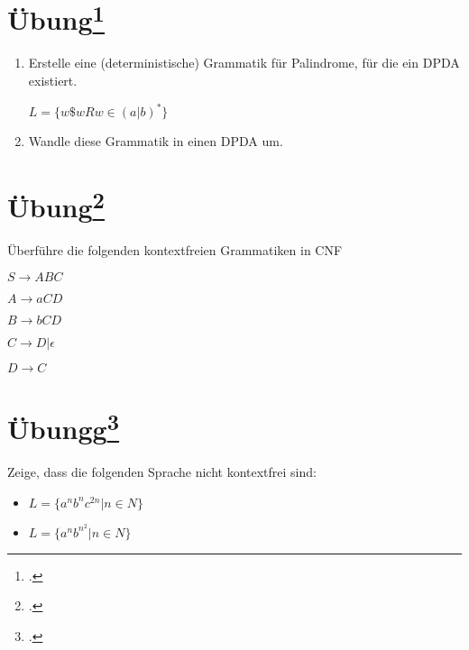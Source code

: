 \documentclass{lehramt-informatik-aufgabe}
\begin{document}
%

\section{Übung\footcite[Seite 34]{theo:fs:2}}

\begin{enumerate}
\item Erstelle eine (deterministische) Grammatik für Palindrome, für die
ein DPDA existiert.

$L = \{ w\$w R w \in (a|b)^* \}$

\item Wandle diese Grammatik in einen DPDA um.
\end{enumerate}

%

\section{Übung\footcite[Seite 37]{theo:fs:2}}

Überführe die folgenden kontextfreien Grammatiken in CNF

$S \rightarrow ABC$

$A \rightarrow aCD$

$B \rightarrow bCD$

$C \rightarrow D | \epsilon$

$D \rightarrow C$

%

\section{Übungg\footcite[Seite 43]{theo:fs:2}}

Zeige, dass die folgenden Sprache nicht kontextfrei sind:

\begin{itemize}
\item $L = \{ a^n b^n c^{2n} | n \in N \}$
\item $L = \{ a^n b^{n^2} | n \in N \}$
\end{itemize}
\end{document}

